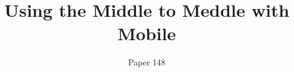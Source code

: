 \documentclass{sig-alt-hotnets}
\begin{document}
\title{Using the Middle to Meddle with Mobile}
\vspace{-2em}

\author{Paper 148}
 
\maketitle



\end{document}

